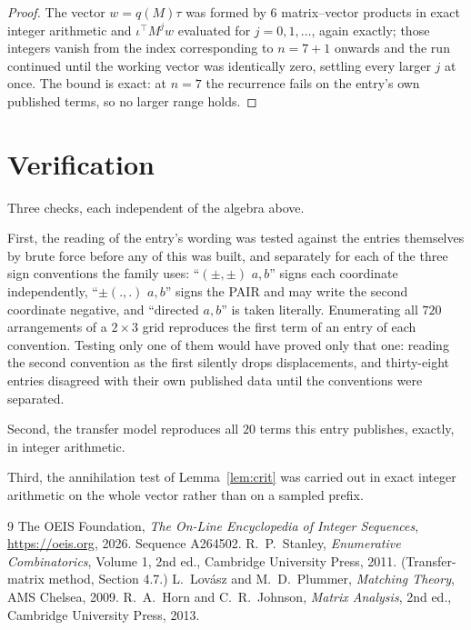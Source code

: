 \documentclass[11pt,a4paper]{article}
\theoremstyle{plain}
\theoremstyle{definition}
\begin{document}
\begin{proof}
The vector $w=q(M)\tau$ was formed by $6$ matrix--vector products in exact integer
arithmetic and $\iota^{\!\top}M^{j}w$ evaluated for $j=0,1,\dots$, again exactly; those
integers vanish from the index corresponding to $n=7+1$ onwards and the run continued
until the working vector was identically zero, settling every larger $j$ at once. The bound is exact: at $n=7$ the recurrence fails on the entry's own published terms, so no larger range holds.
\end{proof}

\section{Verification}

Three checks, each independent of the algebra above.

First, the reading of the entry's wording was tested against the entries themselves by brute
force before any of this was built, and separately for each of the three sign conventions the
family uses: ``$(\pm,\pm)$ $a,b$'' signs each coordinate independently, ``$\pm(.,.)$ $a,b$''
signs the PAIR and may write the second coordinate negative, and ``directed $a,b$'' is taken
literally. Enumerating all $720$ arrangements of a $2\times3$ grid reproduces the first term
of an entry of each convention. Testing only one of them would have proved only that one:
reading the second convention as the first silently drops displacements, and thirty-eight
entries disagreed with their own published data until the conventions were separated.

Second, the transfer model reproduces all $20$ terms this entry publishes, exactly, in
integer arithmetic.

Third, the annihilation test of Lemma~\ref{lem:crit} was carried out in exact integer
arithmetic on the whole vector rather than on a sampled prefix.

\begin{thebibliography}{9}
 The OEIS Foundation, \emph{The On-Line Encyclopedia of Integer
Sequences}, \url{https://oeis.org}, 2026. Sequence A264502.
 R.~P.~Stanley, \emph{Enumerative Combinatorics}, Volume 1, 2nd ed.,
Cambridge University Press, 2011. (Transfer-matrix method, Section 4.7.)
 L.~Lov\'asz and M.~D.~Plummer, \emph{Matching Theory}, AMS Chelsea, 2009.
 R.~A.~Horn and C.~R.~Johnson, \emph{Matrix Analysis}, 2nd ed., Cambridge
University Press, 2013.
\end{thebibliography}
\end{document}
